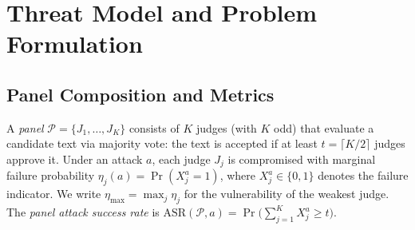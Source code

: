 \section{Threat Model and Problem Formulation}
\label{sec:threat_model}

\subsection{Panel Composition and Metrics}

\begin{table}[t]
\centering
\small
{}
\caption{Attack taxonomy. Targeted attacks exploit individual judge weaknesses; shared-bias attacks affect most judges similarly (\S\ref{sec:experiments}).}
\label{tab:attack_taxonomy}
\end{table}

A \emph{panel} $\mathcal{P} = \{J_1, \ldots, J_K\}$ consists of $K$ judges (with $K$ odd) that evaluate a candidate text via majority vote: the text is accepted if at least $t = \lceil K/2 \rceil$ judges approve it. Under an attack $a$, each judge $J_j$ is compromised with marginal failure probability $\eta_j(a) = \Pr(X_j^a = 1)$, where $X_j^a \in \{0,1\}$ denotes the failure indicator. We write $\eta_{\max} = \max_j \eta_j$ for the vulnerability of the weakest judge. The \emph{panel attack success rate} is $\mathrm{ASR}(\mathcal{P}, a) = \Pr\!\bigl(\sum_{j=1}^K X_j^a \geq t\bigr)$.

